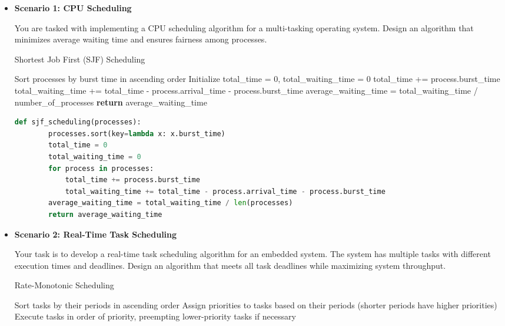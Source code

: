\documentclass[12pt]{book} %
\begin{document}
\begin{itemize}
    \item \textbf{Scenario 1: CPU Scheduling}
    
    You are tasked with implementing a CPU scheduling algorithm for a multi-tasking operating system. Design an algorithm that minimizes average waiting time and ensures fairness among processes.
    
    \begin{algorithm}[H]
        \caption{Shortest Job First (SJF) Scheduling}
        \begin{algorithmic}[1]
            \State Sort processes by burst time in ascending order
            \State Initialize total\_time = 0, total\_waiting\_time = 0
                \State total\_time += process.burst\_time
                \State total\_waiting\_time += total\_time - process.arrival\_time - process.burst\_time
            \EndFor
            \State average\_waiting\_time = total\_waiting\_time / number\_of\_processes
            \State \textbf{return} average\_waiting\_time
            \EndProcedure
        \end{algorithmic}
    \end{algorithm}
    
    \FloatBarrier
    \begin{lstlisting}[language=Python, caption=Python Implementation of SJF Scheduling Algorithm]
    def sjf_scheduling(processes):
        processes.sort(key=lambda x: x.burst_time)
        total_time = 0
        total_waiting_time = 0
        for process in processes:
            total_time += process.burst_time
            total_waiting_time += total_time - process.arrival_time - process.burst_time
        average_waiting_time = total_waiting_time / len(processes)
        return average_waiting_time
    \end{lstlisting}
    \FloatBarrier
    
    \item \textbf{Scenario 2: Real-Time Task Scheduling}
    
    Your task is to develop a real-time task scheduling algorithm for an embedded system. The system has multiple tasks with different execution times and deadlines. Design an algorithm that meets all task deadlines while maximizing system throughput.
    
    \begin{algorithm}[H]
        \caption{Rate-Monotonic Scheduling}
        \begin{algorithmic}[1]
            \State Sort tasks by their periods in ascending order
            \State Assign priorities to tasks based on their periods (shorter periods have higher priorities)
            \State Execute tasks in order of priority, preempting lower-priority tasks if necessary
            \EndProcedure
        \end{algorithmic}
    \end{algorithm}
    

\end{itemize}
\end{document}
